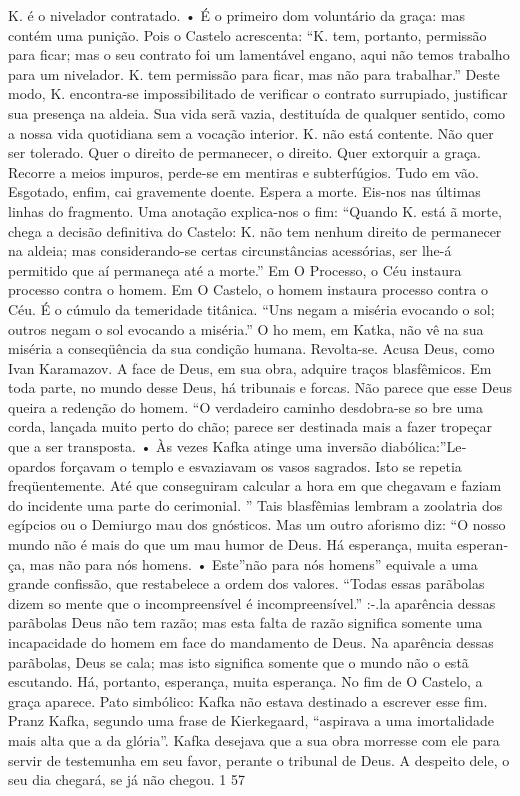 K. é o nivelador contratado. • É o primeiro dom voluntário da graça: mas
contém uma punição. Pois o Castelo acrescenta: ``K. tem, portanto,
permissão para ficar; mas o seu contrato foi um lamentável engano, aqui
não temos trabalho para um nivelador. K. tem permissão para ficar, mas
não para trabalhar.'' Deste modo, K. encontra-se impossibilitado de
verificar o contrato surrupiado, justificar sua presença na aldeia. Sua
vida serã vazia, destituída de qualquer sentido, como a nossa vida
quotidiana sem a vocação interior. K. não está contente. Não quer ser
tolerado. Quer o direito de permanecer, o direito. Quer extorquir a
graça. Recorre a meios impuros, perde-se em mentiras e subterfúgios.
Tudo em vão. Esgotado, enfim, cai gravemente doente. Espera a morte.
Eis-nos nas últimas linhas do fragmento. Uma anotação explica-nos o fim:
``Quando K. está ã morte, chega a decisão definitiva do Castelo: K. não
tem nenhum direito de permanecer na aldeia; mas considerando-se certas
circunstâncias acessórias, ser­ lhe-á permitido que aí permaneça até a
morte.'' Em O Processo, o Céu instaura processo contra o homem. Em O
Castelo, o homem instaura processo contra o Céu. É o cúmulo da
temeridade titânica. ``Uns negam a miséria evocando o sol; outros negam
o sol evocando a miséria.'' O ho­ mem, em Katka, não vê na sua miséria a
conseqüência da sua condição humana. Revolta-se. Acusa Deus, como Ivan
Karamazov. A face de Deus, em sua obra, adquire traços blasfêmicos. Em
toda parte, no mundo desse Deus, há tribunais e forcas. Não parece que
esse Deus queira a redenção do homem. ``O verdadeiro caminho desdobra-se
so­ bre uma corda, lançada muito perto do chão; parece ser destinada
mais a fazer tropeçar que a ser transposta. • Às vezes Kafka atinge uma
inversão diabólica:''Le­ opardos forçavam o templo e esvaziavam os vasos
sagrados. Isto se repetia freqüentemente. Até que conseguiram calcular a
hora em que chegavam e faziam do incidente uma parte do cerimonial. ''
Tais blasfêmias lembram a zoolatria dos egípcios ou o Demiurgo mau dos
gnósticos. Mas um outro aforismo diz: ``O nosso mundo não é mais do que
um mau humor de Deus. Há esperança, muita esperan­ ça, mas não para nós
homens. • Este''não para nós homens'' equivale a uma grande confissão,
que restabelece a ordem dos valores. ``Todas essas parãbolas dizem so­
mente que o incompreensível é incompreensível.'' :-.la aparência dessas
parãbolas Deus não tem razão; mas esta falta de razão significa somente
uma incapacidade do homem em face do mandamento de Deus. Na aparência
dessas parãbolas, Deus se cala; mas isto significa somente que o mundo
não o estã escutando. Há, portanto, esperança, muita esperança. No fim
de O Castelo, a graça aparece. Pato simbólico: Kafka não estava
destinado a escrever esse fim. Pranz Kafka, segundo uma frase de
Kierkegaard, ``aspirava a uma imortalidade mais alta que a da glória''.
Kafka desejava que a sua obra morresse com ele para servir de testemunha
em seu favor, perante o tribunal de Deus. A despeito dele, o seu dia
chegará, se já não chegou. 1 57

